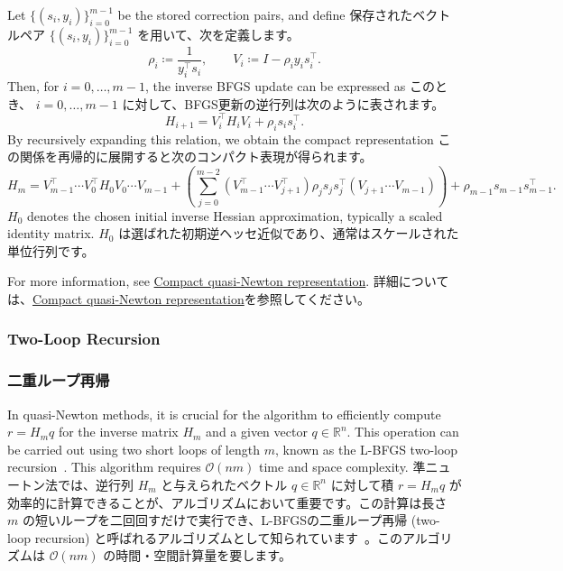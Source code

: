 \documentclass[0_main]{subfiles}
\begin{document}
\ifEn
    Let $\{(s_i,y_i)\}_{i=0}^{m-1}$ be the stored correction pairs, and define
\else
    保存されたベクトルペア $\{(s_i,y_i)\}_{i=0}^{m-1}$ を用いて、次を定義します。
\fi
\begin{equation*}
    \rho_i \coloneqq \frac{1}{y_i^\top s_i}, \qquad
    V_i \coloneqq I - \rho_i y_i s_i^\top.
\end{equation*}
\ifEn
    Then, for $i = 0,\dots, m-1$, the inverse BFGS update can be expressed as
\else
    このとき、 $i = 0,\dots, m-1$ に対して、BFGS更新の逆行列は次のように表されます。
\fi
\begin{equation*}
    H_{i+1} = V_i^\top H_i V_i + \rho_i s_i s_i^\top.
\end{equation*}
\ifEn
    By recursively expanding this relation, we obtain the compact representation
\else
    この関係を再帰的に展開すると次のコンパクト表現が得られます。
\fi
\begin{equation*}
    H_m = V_{m-1}^\top \cdots V_0^\top H_0 V_0 \cdots V_{m-1} + \left(\sum_{j=0}^{m-2} (V_{m-1}^\top \cdots V_{j+1}^\top) \rho_j s_j s_j^\top (V_{j+1} \cdots V_{m-1})\right) + \rho_{m-1} s_{m-1} s_{m-1}^\top.
\end{equation*}
\ifEn
    $H_0$ denotes the chosen initial inverse Hessian approximation, typically a scaled identity matrix.
\else
    $H_0$ は選ばれた初期逆ヘッセ近似であり、通常はスケールされた単位行列です。
\fi

\ifEn
    For more information, see \href{https://en.wikipedia.org/wiki/Compact_quasi-Newton_representation}{Compact quasi-Newton representation}.
\else
    詳細については、\href{https://en.wikipedia.org/wiki/Compact_quasi-Newton_representation}{Compact quasi-Newton representation}を参照してください。
\fi

\ifEn
    \subsubsection{Two-Loop Recursion}
\else
    \subsubsection{二重ループ再帰}
\fi

\ifEn
    In quasi-Newton methods, it is crucial for the algorithm to efficiently compute $r = H_m q$ for the inverse matrix $H_m$ and a given vector $q \in \mathbb{R}^n$. This operation can be carried out using two short loops of length $m$, known as the L-BFGS two-loop recursion~\citep[Algorithm 7.4]{nocedal1999numerical}. This algorithm requires $\mathcal{O}(nm)$ time and space complexity.
\else
    準ニュートン法では、逆行列 $H_m$ と与えられたベクトル $q \in \mathbb{R}^n$ に対して積 $r = H_m q$ が効率的に計算できることが、アルゴリズムにおいて重要です。この計算は長さ $m$ の短いループを二回回すだけで実行でき、L-BFGSの二重ループ再帰 (two-loop recursion) と呼ばれるアルゴリズムとして知られています~\citep[Algorithm 7.4]{nocedal1999numerical}。このアルゴリズムは $\mathcal{O}(nm)$ の時間・空間計算量を要します。
\fi
\end{document}
